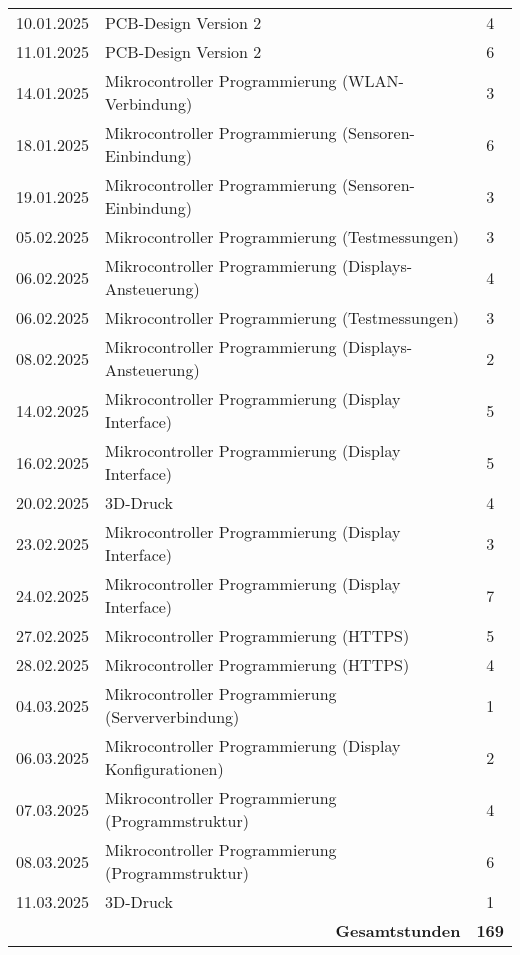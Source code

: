 \begin{longtable}{|l|p{9cm}|c|}
10.01.2025 & PCB-Design Version 2 & 4 \\
11.01.2025 & PCB-Design Version 2 & 6 \\
14.01.2025 & Mikrocontroller Programmierung (WLAN-Verbindung) & 3 \\
18.01.2025 & Mikrocontroller Programmierung (Sensoren-Einbindung) & 6 \\
19.01.2025 & Mikrocontroller Programmierung (Sensoren-Einbindung) & 3 \\
05.02.2025 & Mikrocontroller Programmierung (Testmessungen) & 3 \\
06.02.2025 & Mikrocontroller Programmierung (Displays-Ansteuerung) & 4 \\
06.02.2025 & Mikrocontroller Programmierung (Testmessungen) & 3 \\
08.02.2025 & Mikrocontroller Programmierung (Displays-Ansteuerung) & 2 \\
14.02.2025 & Mikrocontroller Programmierung (Display Interface) & 5 \\
16.02.2025 & Mikrocontroller Programmierung (Display Interface) & 5 \\
20.02.2025 & 3D-Druck & 4 \\
23.02.2025 & Mikrocontroller Programmierung (Display Interface) & 3 \\
24.02.2025 & Mikrocontroller Programmierung (Display Interface) & 7 \\
27.02.2025 & Mikrocontroller Programmierung (HTTPS) & 5 \\
28.02.2025 & Mikrocontroller Programmierung (HTTPS) & 4 \\
04.03.2025 & Mikrocontroller Programmierung (Serververbindung) & 1 \\
06.03.2025 & Mikrocontroller Programmierung (Display Konfigurationen) & 2 \\
07.03.2025 & Mikrocontroller Programmierung (Programmstruktur) & 4 \\
08.03.2025 & Mikrocontroller Programmierung (Programmstruktur) & 6 \\
11.03.2025 & 3D-Druck & 1 \\
    \hline
    \multicolumn{2}{|r|}{\textbf{Gesamtstunden}} & \textbf{169} \\
    \hline
\end{longtable}



\renewcommand{\arraystretch}{1}
